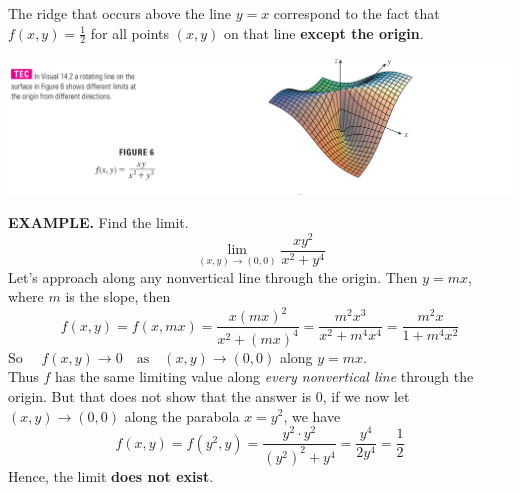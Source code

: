 \documentclass{article}
\begin{document}
The ridge that occurs above the line $y = x$ correspond to the fact that $f(x,y) = \frac{1 }{2 }$ for all points $(x,y)$ on that line \textbf{except the origin}.
\begin{center}
  \includegraphics[width = \linewidth]{./images/limeg2.png} 
\end{center}
{\selectfont \textbf{\textcolor{blue5}{EXAMPLE.}}} Find the limit.
\[\lim_{(x,y) \to (0,0)} \frac{x y^2 }{x^2 + y^4}\]
Let's approach along any nonvertical line through the origin. Then $y = mx$, where $m$ is the slope, then
\[f(x,y) = f(x, mx) = \frac{x(mx)^2}{x^2 + (mx)^4} = \frac{m^2 x^3}{x^2 + m^4 x^4} = \frac{m^2 x}{1 + m^4 x^2}\]
So $\quad f(x,y) \to 0 \quad \text{as} \quad (x,y) \to (0,0)$ along $y = mx$.\\
Thus $f$ has the same limiting value along \textit{every nonvertical line} through the origin. But that does not show that the answer is 0, if we now let $(x,y) \to (0,0)$ along the parabola $x = y^2$, we have 
\[f(x,y) = f(y^2, y) = \frac{y^2 \cdot y^2 }{(y^2 )^2 + y^4} = \frac{y^4}{2y^4} = \frac{1 }{2 }\]
Hence, the limit \textbf{does not exist}.
\end{document}
